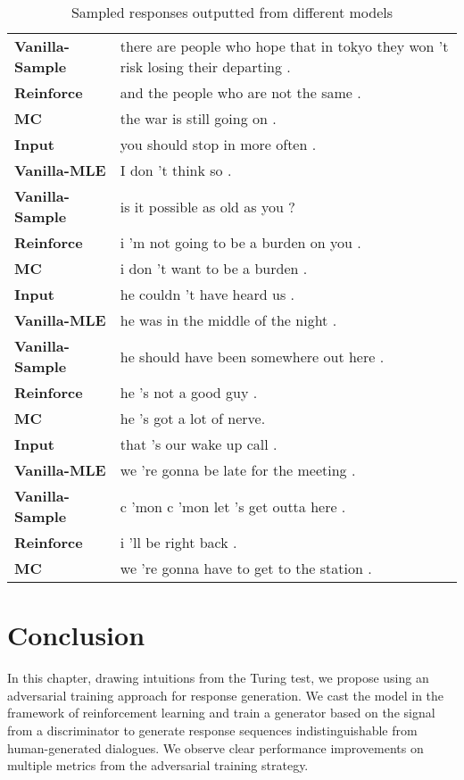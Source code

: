\begin{table*}[!htb]
\begin{tabular}{p{4cm}p{8cm}}
{\bf Vanilla-Sample}&there are people who hope that in tokyo they won 't risk losing their departing .\\
{\bf Reinforce}&and the people who are not the same .\\
{\bf MC}&the war is still going on .\\\midrule
{\bf Input}&you should stop in more often .\\
{\bf Vanilla-MLE}&I don 't think so .\\
{\bf Vanilla-Sample}&is it possible as old as you ?\\
{\bf Reinforce}&i 'm not going to be a burden on you .\\
{\bf MC}&i don 't want to be a burden .\\\hline{\bf Input}&he couldn 't have heard us .\\
{\bf Vanilla-MLE}&he was in the middle of the night  .\\
{\bf Vanilla-Sample}&he should have been somewhere out here .\\
{\bf Reinforce}&he 's not a good guy .\\
{\bf MC}&he 's got a lot of nerve.\\\midrule
{\bf Input}&that 's our wake up call .\\
{\bf Vanilla-MLE}&we 're gonna be late for the meeting .\\
{\bf Vanilla-Sample}&c 'mon c 'mon let 's get outta here .\\
{\bf Reinforce}&i 'll be right back .\\
{\bf MC}&we 're gonna have to get to the station .\\
\bottomrule
\end{tabular}
\caption{Sampled responses outputted from different models}
\label{example-appendix2}
\end{table*}

\section{Conclusion }
In this chapter, drawing  intuitions from the Turing test, we propose using an adversarial training approach for response generation. We cast the model in the framework of reinforcement learning and train a generator based on the signal from a discriminator to generate response sequences indistinguishable from human-generated dialogues.
We observe clear performance improvements on multiple metrics from the adversarial training strategy.

